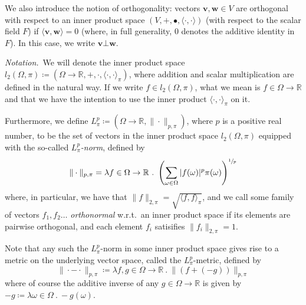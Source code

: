 	\begin{comment}
		We will further denote, for the typical vector space where $V = \Omega \rightarrow
		\mathbb{R}$ with respect to real numbers,
		$\langle\cdot, \cdot\rangle_\pi = \lambda\mathbf{v},\mathbf{w}\ .\ \sum_{\omega\in
		\Omega} \mathbf{v}(\omega)\cdot\mathbf{w}(\omega)\cdot\pi(\omega)$, for some fixed
		$\pi \in \Omega \rightarrow \mathbb{R}^{+}$. With this definition it is easy 
		to see that this construct satisfies the axioms for an inner product. We also note
		that, if $\pi$ is a probability distribution, then $\langle f, g \rangle_\pi = 
		\mathbb{E}_\pi(f\cdot g)$, and that with this definition the sxioms for inner 
		product spaces are indeed satisfied.
	\end{comment}

	We also introduce the notion of orthogonality: vectors $\mathbf{v}, \mathbf{w} \in V$ are
	orthogonal with respect to an inner product space $(V,+,\bullet,\langle\cdot,\cdot\rangle)$
	(with respect to the scalar field $F$) if $\langle\mathbf{v},\mathbf{w}\rangle=0$ (where,
	in full generality, $0$ denotes the additive identity in $F$). In this case, we write 
	$\mathbf{v} \bot \mathbf{w}$.

	\emph{Notation.}~We will denote the inner product space $l_{2}(\Omega, \pi) \coloneqq 
	(\Omega \rightarrow \mathbb{R}, +, \cdot, \langle \cdot , \cdot \rangle_\pi)$, where 
	addition and scalar multiplication are defined in the natural way. If we write $f \in 
	l_2(\Omega, \pi)$, what we mean is $f \in \Omega \rightarrow \mathbb{R}$ and that we have 
	the intention to use the inner product $\langle \cdot,\cdot \rangle_\pi$ on it. 

	Furthermore, we define $L^p_\pi \coloneqq (\Omega\rightarrow\mathbb{R},\|\cdot\|_{p,\pi})$, 
	where $p$ is a positive real number, to be the set of vectors in the inner product space 
	$l_2(\Omega,\pi)$ equipped with the so-called \emph{$L^p_\pi$-norm}, defined by
	$$
		\|\cdot\|_{p,\pi}=\lambda f\in\Omega\rightarrow\mathbb{R}\ .\ 
		\left(\sum_{\omega\in\Omega} | f(\omega)|^p \pi(\omega) \right)^{\sfrac{1}{p}}
	$$
	where, in particular, we have that $\|f\|_{2,\pi} = \sqrt{\langle f, f\rangle_\pi}$, and 
	we call some family of vectors $f_1, f_2 \hdots$ \emph{orthonormal} w.r.t.\ an inner 
	product space if its elements are pairwise orthogonal, and each element $f_i$ satisifies 
	$\|f_i\|_{2,\pi} = 1$.
	
	Note that any such the $L_\pi^p$-norm in some inner product space gives rise to a metric 
	on the underlying vector space, called the $L^p_\pi$-metric, defined by 
	$$
		\|\cdot - \cdot\|_{p,\pi} \coloneqq \lambda f, g \in \Omega \rightarrow \mathbb{R}
		\ .\ \|(f + (-g))\|_{p, \pi}
	$$
	where of course the additive inverse of any $g \in \Omega \rightarrow \mathbb{R}$ is given 
	by $-g \coloneqq \lambda \omega \in \Omega\ .\ -g(\omega)$.

